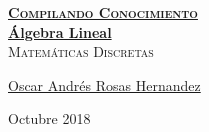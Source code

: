 \documentclass[12pt, fleqn]{report}                             %
\author{Oscar Andrés Rosas}                                     %
\theoremstyle{break}                                            %
\begin{document}
\begin{titlepage}
    
    \pagecolor{TitlePageColor}                                      %
    \color{white}                                                   %

    \vspace                                                         %
    \baselineskip                                                   %

    \makebox[0pt][l]{\rule{1.3\textwidth}{3pt}}                     %
    
    \href{https://compilandoconocimiento.com}                       %
    {\textbf{\textsc{\Huge Compilando Conocimiento}}}\\[2.7cm]      %

    \href{\ProjectNameLink}                                         %
    {\fontsize{65}{78}\selectfont \textbf{Álgebra Lineal}}\\[0.5cm] %
    \textcolor{ColorSubtext}{\textsc{\Huge Matemáticas Discretas}}  %
    
    \vfill                                                          %
    
    \href{\ProjectAuthorLink}                                       %
    {\LARGE \textsf{Oscar Andrés Rosas Hernandez}}                  %

    \vspace                                                         %
    \baselineskip                                                   %
    
    {\large \textsf{Octubre 2018}}                                  %
\end{titlepage}


\restoregeometry                                                    %
\nopagecolor                                                        %
\end{document}
